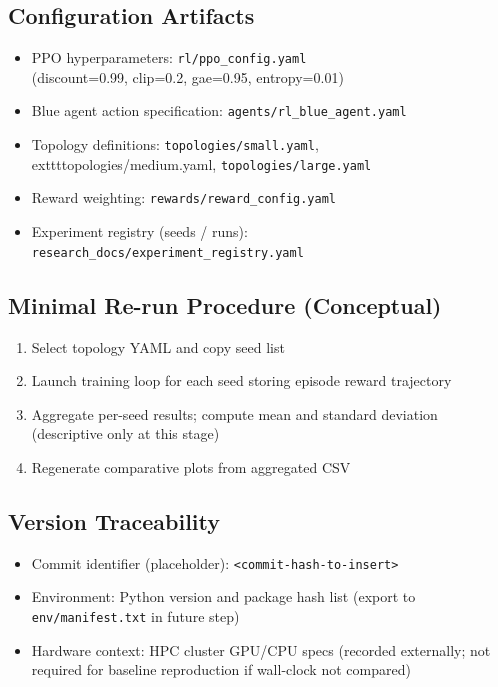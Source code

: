 \documentclass[12pt,oneside]{article}
\begin{document}
\subsection{Configuration Artifacts}
\begin{itemize}
    \item PPO hyperparameters: \texttt{rl/ppo\_config.yaml} \\
          (discount=0.99, clip=0.2, gae=0.95, entropy=0.01)
    \item Blue agent action specification: \texttt{agents/rl\_blue\_agent.yaml}
    \item Topology definitions: \texttt{topologies/small.yaml}, \\
          	exttt{topologies/medium.yaml}, \texttt{topologies/large.yaml}
    \item Reward weighting: \texttt{rewards/reward\_config.yaml}
    \item Experiment registry (seeds / runs): \texttt{research\_docs/experiment\_registry.yaml}
\end{itemize}

\subsection{Minimal Re-run Procedure (Conceptual)}
\begin{enumerate}
    \item Select topology YAML and copy seed list
    \item Launch training loop for each seed storing episode reward trajectory
    \item Aggregate per-seed results; compute mean and standard deviation (descriptive only at this stage)
    \item Regenerate comparative plots from aggregated CSV
\end{enumerate}

\subsection{Version Traceability}
\begin{itemize}
    \item Commit identifier (placeholder): \texttt{<commit-hash-to-insert>}
    \item Environment: Python version and package hash list (export to \texttt{env/manifest.txt} in future step)
    \item Hardware context: HPC cluster GPU/CPU specs (recorded externally; not required for baseline reproduction if wall-clock not compared)
\end{itemize}







\end{document}
